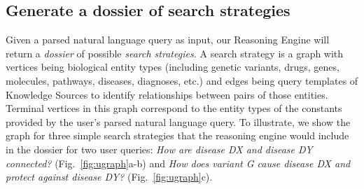 \documentclass[11pt,notitlepage]{article}
\begin{document}
\subsection{Generate a dossier of search strategies}
\label{section:strategies}
Given a parsed natural language query as input, our Reasoning Engine will return
a {\em dossier\/} of possible {\em search strategies.\/} A search
strategy is a {\color{red} graph} with vertices being biological entity types (including genetic
variants, drugs, genes, molecules, pathways, diseases, diagnoses,
etc.) and edges being query templates of Knowledge Sources to identify
relationships between pairs of those entities.
Terminal vertices in this {\color{red} graph} correspond to
the entity types of the constants provided by the user's parsed natural language
query. To illustrate, we show the {\color{red} graph} for three simple search strategies that
the reasoning engine would include in the dossier for two user queries: {\em How
  are disease DX and disease DY connected?\/} (Fig.~\ref{fig:ugraph}a-b) and
{\em How does variant G cause disease DX and protect against disease DY?\/}
(Fig.~\ref{fig:ugraph}c).
\end{document}
